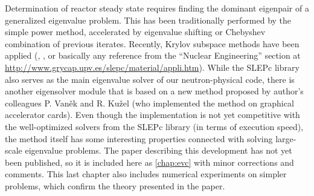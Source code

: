Determination of reactor steady state requires finding the dominant eigenpair of a generalized eigenvalue problem. This
has been traditionally performed by the simple power method, accelerated by eigenvalue shifting or Chebyshev
combination of previous iterates. Recently, Krylov subspace methods have been applied (\cite{warsa}, \cite{Subramanian},
or basically any reference from the ``Nuclear Engineering'' section at
\url{http://www.grycap.upv.es/slepc/material/appli.htm}). While the SLEPc library also serves as the main eigenvalue
solver of our neutron-physical code, there is another eigensolver module that is based on a new method
proposed by author's colleagues P. Van{\v e}k and R. Ku{\v z}el (who implemented the method on graphical accelerator
cards). Even though the implementation is not yet competitive with the well-optimized
solvers from the SLEPc library (in terms of execution speed), the method itself has some interesting properties
connected with solving large-scale eigenvalue problems. The paper describing this development has not yet been 
published, so it is included here as \cref{chap:evc} with minor corrections and comments. This last chapter also
includes numerical experiments on simpler problems, which confirm the theory presented in the paper.
